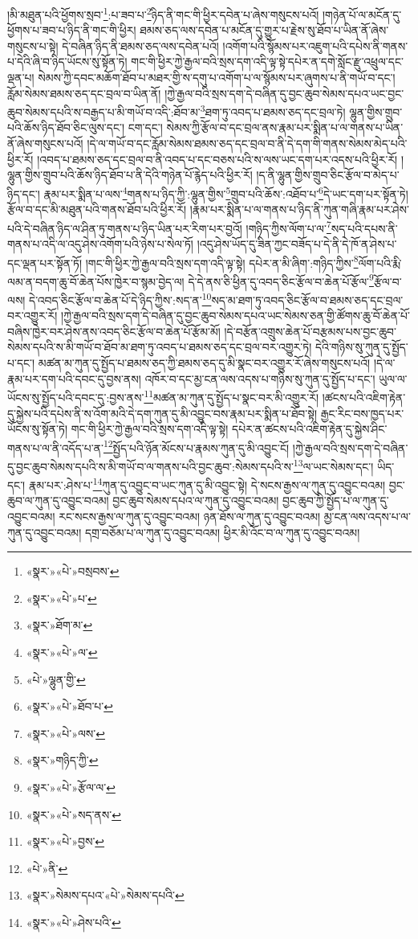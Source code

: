 །མི་མཐུན་པའི་ཕྱོགས་སྲབ་\footnote{«སྣར་»«པེ་»བསྲབས་}:པ་ཟབ་པ་\footnote{«སྣར་»«པེ་»པ་}ཉིད་ནི་གང་གི་ཕྱིར་དབེན་པ་ཞེས་གསུངས་པའོ། །གཉེན་པོ་ལ་མངོན་དུ་ཕྱོགས་པ་ཟབ་པ་ཉིད་ནི་གང་གི་ཕྱིར། ཐམས་ཅད་ལས་དབེན་པ་མངོན་དུ་གྱུར་པ་རྗེས་སུ་ཐོབ་པ་ཡིན་ནོ་ཞེས་གསུངས་པ་སྟེ། དེ་བཞིན་ཉིད་ནི་ཐམས་ཅད་ལས་དབེན་པའོ། །འགོག་པའི་སྙོམས་པར་འཇུག་པའི་དཔེས་ནི་གནས་པ་དེའི་ཞི་བ་ཉིད་ཡོངས་སུ་སྟོན་ཏེ། གང་གི་ཕྱིར་ཀྱེ་རྒྱལ་བའི་སྲས་དག་འདི་ལྟ་སྟེ་དཔེར་ན་དགེ་སློང་རྫུ་འཕྲུལ་དང་ལྡན་པ། སེམས་ཀྱི་དབང་མཆོག་ཐོབ་པ་མཐར་གྱི་ས་དགུ་པ་འགོག་པ་ལ་སྙོམས་པར་ཞུགས་པ་ནི་གཡོ་བ་དང་། རློམ་སེམས་ཐམས་ཅད་དང་བྲལ་བ་ཡིན་ནོ། །ཀྱེ་རྒྱལ་བའི་སྲས་དག་དེ་བཞིན་དུ་བྱང་ཆུབ་སེམས་དཔའ་ཡང་བྱང་ཆུབ་སེམས་དཔའི་ས་བརྒྱད་པ་མི་གཡོ་བ་འདི་:ཐོབ་མ་\footnote{«སྣར་»ཐོག་མ་}ཐག་ཏུ་འབད་པ་ཐམས་ཅད་དང་བྲལ་ཏེ། ལྷུན་གྱིས་གྲུབ་པའི་ཆོས་ཉིད་ཐོབ་ཅིང་ལུས་དང་། ངག་དང་། སེམས་ཀྱི་རྩོལ་བ་དང་བྲལ་ནས་རྣམ་པར་སྨིན་པ་ལ་གནས་པ་ཡིན་ནོ་ཞེས་གསུངས་པའོ། །དེ་ལ་གཡོ་བ་དང་རློམ་སེམས་ཐམས་ཅད་དང་བྲལ་བ་ནི་དེ་དག་གི་གནས་སེམས་མེད་པའི་ཕྱིར་རོ། །འབད་པ་ཐམས་ཅད་དང་བྲལ་བ་ནི་འབད་པ་དང་བཅས་པའི་ས་ལས་ཡང་དག་པར་འདས་པའི་ཕྱིར་རོ། །ལྷུན་གྱིས་གྲུབ་པའི་ཆོས་ཉིད་ཐོབ་པ་ནི་དེའི་གཉེན་པོ་རྙེད་པའི་ཕྱིར་རོ། །ད་ནི་ལྷུན་གྱིས་གྲུབ་ཅིང་རྩོལ་བ་མེད་པ་ཉིད་དང་། རྣམ་པར་སྨིན་པ་ལས་\footnote{«སྣར་»«པེ་»ལ་}གནས་པ་ཉིད་ཀྱི་:ལྷུན་གྱིས་\footnote{«པེ་»ལྷུན་གྱི་}གྲུབ་པའི་ཆོས་:འཐོབ་པ་\footnote{«སྣར་»«པེ་»ཐོབ་པ་}དེ་ཡང་དག་པར་སྟོན་ཏེ། རྩོལ་བ་དང་མི་མཐུན་པའི་གནས་ཐོབ་པའི་ཕྱིར་རོ། །རྣམ་པར་སྨིན་པ་ལ་གནས་པ་ཉིད་ནི་ཀུན་གཞི་རྣམ་པར་ཤེས་པའི་དེ་བཞིན་ཉིད་ལ་ཤིན་ཏུ་གནས་པ་ཉིད་ཡིན་པར་རིག་པར་བྱའོ། །གཉིད་ཀྱིས་ལོག་པ་ལ་\footnote{«སྣར་»«པེ་»ལས་}སད་པའི་དཔས་ནི་གནས་པ་འདི་ལ་འདུ་ཤེས་འགོག་པའི་ཉེས་པ་སེལ་ཏོ། །འདུ་ཤེས་ཡོད་དུ་ཟིན་ཀྱང་བཟོད་པ་དེ་ནི་དེ་ཁོ་ན་ཤེས་པ་དང་ལྡན་པར་སྟོན་ཏོ། །གང་གི་ཕྱིར་ཀྱེ་རྒྱལ་བའི་སྲས་དག་འདི་ལྟ་སྟེ། དཔེར་ན་མི་ཞིག་:གཉིད་ཀྱིས་\footnote{«སྣར་»གཉིད་ཀྱི་}ལོག་པའི་རྨི་ལམ་ན་བདག་ཆུ་བོ་ཆེན་པོས་ཁྱེར་བ་སྙམ་བྱེད་ལ། དེ་དེ་ནས་ཅི་ཕྱིན་དུ་འབད་ཅིང་རྩོལ་བ་ཆེན་པོ་རྩོལ་\footnote{«སྣར་»«པེ་»རྩོལ་ལ་}རྩོལ་བ་ལས། དེ་འབད་ཅིང་རྩོལ་བ་ཆེན་པོ་དེ་ཉིད་ཀྱིས་:སད་ན་\footnote{«སྣར་»«པེ་»སད་ནས་}སད་མ་ཐག་ཏུ་འབད་ཅིང་རྩོལ་བ་ཐམས་ཅད་དང་བྲལ་བར་འགྱུར་རོ། །ཀྱེ་རྒྱལ་བའི་སྲས་དག་དེ་བཞིན་དུ་བྱང་ཆུབ་སེམས་དཔའ་ཡང་སེམས་ཅན་གྱི་ཚོགས་ཆུ་བོ་ཆེན་པོ་བཞིས་ཁྱེར་བར་ཤེས་ནས་འབད་ཅིང་རྩོལ་བ་ཆེན་པོ་རྩོམ་མོ། །དེ་བརྩོན་འགྲུས་ཆེན་པོ་བརྩམས་པས་བྱང་ཆུབ་སེམས་དཔའི་ས་མི་གཡོ་བ་ཐོབ་མ་ཐག་ཏུ་འབད་པ་ཐམས་ཅད་དང་བྲལ་བར་འགྱུར་ཏེ། དེའི་གཉིས་སུ་ཀུན་དུ་སྤྱོད་པ་དང་། མཚན་མ་ཀུན་དུ་སྤྱོད་པ་ཐམས་ཅད་ཀྱི་ཐམས་ཅད་དུ་མི་སྣང་བར་འགྱུར་རོ་ཞེས་གསུངས་པའོ། །དེ་ལ་རྣམ་པར་དག་པའི་དབང་དུ་བྱས་ནས། འཁོར་བ་དང་མྱ་ངན་ལས་འདས་པ་གཉིས་སུ་ཀུན་དུ་སྤྱོད་པ་དང་། ཡུལ་ལ་ཡོངས་སུ་སྤྱོད་པའི་དབང་དུ་:བྱས་ནས་\footnote{«སྣར་»«པེ་»བྱས་}མཚན་མ་ཀུན་དུ་སྤྱོད་པ་སྣང་བར་མི་འགྱུར་རོ། །ཚངས་པའི་འཇིག་རྟེན་དུ་སྐྱེས་པའི་དཔེས་ནི་ས་འོག་མའི་དེ་དག་ཀུན་དུ་མི་འབྱུང་བས་རྣམ་པར་སྨིན་པ་ཐོབ་སྟེ། རྒྱང་རིང་བས་ཁྱད་པར་ཡོངས་སུ་སྟོན་ཏེ། གང་གི་ཕྱིར་ཀྱེ་རྒྱལ་བའི་སྲས་དག་འདི་ལྟ་སྟེ། དཔེར་ན་ཚངས་པའི་འཇིག་རྟེན་དུ་སྐྱེས་ཤིང་གནས་པ་ལ་ནི་འདོད་པ་ན་\footnote{«པེ་»ནི་}སྤྱོད་པའི་ཉོན་མོངས་པ་རྣམས་ཀུན་དུ་མི་འབྱུང་ངོ། །ཀྱེ་རྒྱལ་བའི་སྲས་དག་དེ་བཞིན་དུ་བྱང་ཆུབ་སེམས་དཔའི་ས་མི་གཡོ་བ་ལ་གནས་པའི་བྱང་ཆུབ་:སེམས་དཔའི་ས་\footnote{«སྣར་»སེམས་དཔའ་«པེ་»སེམས་དཔའི་}ལ་ཡང་སེམས་དང་། ཡིད་དང་། རྣམ་པར་:ཤེས་པ་\footnote{«སྣར་»«པེ་»ཤེས་པའི་}ཀུན་དུ་འབྱུང་བ་ཡང་ཀུན་དུ་མི་འབྱུང་སྟེ། དེ་སངས་རྒྱས་ལ་ཀུན་དུ་འབྱུང་བའམ། བྱང་ཆུབ་ལ་ཀུན་དུ་འབྱུང་བའམ། བྱང་ཆུབ་སེམས་དཔའ་ལ་ཀུན་དུ་འབྱུང་བའམ། བྱང་ཆུབ་ཀྱི་སྤྱོད་པ་ལ་ཀུན་དུ་འབྱུང་བའམ། རང་སངས་རྒྱས་ལ་ཀུན་དུ་འབྱུང་བའམ། ཉན་ཐོས་ལ་ཀུན་དུ་འབྱུང་བའམ། མྱ་ངན་ལས་འདས་པ་ལ་ཀུན་དུ་འབྱུང་བའམ། དགྲ་བཅོམ་པ་ལ་ཀུན་དུ་འབྱུང་བའམ། ཕྱིར་མི་འོང་བ་ལ་ཀུན་དུ་འབྱུང་བའམ། 